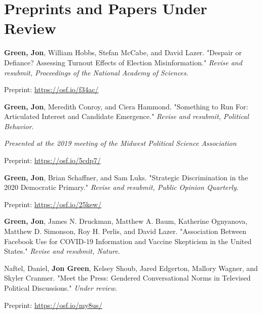 \documentclass[letterpaper]{article}
\renewenvironment{itemize}{
  \begin{list}{}{
    \setlength{\leftmargin}{1.5em}
  }
}{
  \end{list}
}
\begin{document}
\section*{Preprints and Papers Under Review}

\begin{itemize}

\item  \textbf{Green, Jon}, William Hobbs, Stefan McCabe, and David Lazer. "Despair or Defiance? Assessing Turnout Effects of Election Misinformation."  \textit{Revise and resubmit, Proceedings of the National Academy of Sciences}.
\begin{itemize}
\item Preprint: \url{https://osf.io/f34ac/}
\end{itemize}

\item \textbf{Green, Jon}, Meredith Conroy, and Ciera Hammond. "Something to Run For: Articulated Interest and Candidate Emergence."   \textit{Revise and resubmit, Political Behavior}.
\begin{itemize}
\item \textit{Presented at the 2019 meeting of the Midwest Political Science Association}
\item Preprint: \url{https://osf.io/5cdp7/}
\end{itemize}

\item \textbf{Green, Jon}, Brian Schaffner, and Sam Luks. "Strategic Discrimination in the 2020 Democratic Primary."  \textit{Revise and resubmit, Public Opinion Quarterly}.
\begin{itemize}
\item Preprint: \url{https://osf.io/25kew/}
\end{itemize}

\item \textbf{Green, Jon}, James N. Druckman, Matthew A. Baum, Katherine Ognyanova, Matthew D. Simonson, Roy H. Perlis, and David Lazer. "Association Between Facebook Use for COVID-19 Information and Vaccine Skepticism in the United States." \textit{Revise and resubmit, Nature}.

\item Naftel, Daniel, \textbf{Jon Green}, Kelsey Shoub, Jared Edgerton, Mallory Wagner, and Skyler Cranmer. "Meet the Press: Gendered Conversational Norms in Televised Political Discussions." \textit{Under review}.
\begin{itemize}
\item Preprint: \url{https://osf.io/my8us/}
\end{itemize}


\end{itemize}
\end{document}
